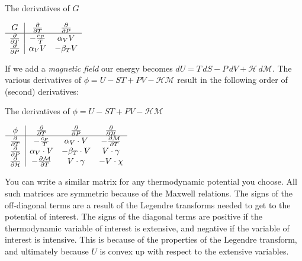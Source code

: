 \documentclass[12pt]{article}
\begin{document}
\begin{table}[ht]
  \centering
  \Large
 \caption{The derivatives of $G$}
 \renewcommand{\arraystretch}{1.5}%
 $\begin{array}{c | c c}
 G                           & \frac{\partial}{\partial T} & \frac{\partial}{\partial P} \\%
 \hline
 \frac{\partial}{\partial T} & -\frac{c_P}{T}              & \alpha_V V                  \\%
 \frac{\partial}{\partial P} & \alpha_V V                  & -\beta_T V                  \\%
 \end{array}$
\end{table}



If we add a \emph{magnetic field} our energy becomes $dU = T\, dS - P\, dV + \mathcal{H} \, d\mathcal{M}$.  The various derivatives of $\phi = U - ST + PV - \mathcal{H}\mathcal{M}$ result in the following order of (second) derivatives:
\begin{table}[ht]
  \centering
  \Large
 \caption{The derivatives of $\phi = U - ST + PV - \mathcal{H}\mathcal{M}$}
 \renewcommand{\arraystretch}{1.5}%
 $\begin{array}{c | c c c}
\phi & \frac{\partial}{\partial T} & \frac{\partial}{\partial P}& \frac{\partial}{\partial \mathcal{H}}\\ \hline
\frac{\partial}{\partial T} & -\frac{c_P}{T} & \alpha_V \cdot V & -\frac{\partial \mathcal{M}}{\partial T}\\ %
\frac{\partial}{\partial P} & \alpha_V \cdot V & -\beta_T \cdot V & V \cdot \gamma\\ %
\frac{\partial}{\partial \mathcal{H}} & -\frac{\partial \mathcal{M}}{\partial T} & V \cdot \gamma & -V \cdot \chi
 \end{array}$
\end{table}
You can write a similar matrix for any thermodynamic potential you choose. All such matrices are symmetric because of the Maxwell relations. The signs of the off-diagonal terms are a result of the Legendre transforms needed to get to the potential of interest. The signs of the diagonal terms are positive if the thermodynamic variable of interest is extensive, and negative if the variable of interest is intensive. This is because of the properties of the Legendre transform, and ultimately because $U$ is convex up with respect to the extensive variables.
\end{document}
